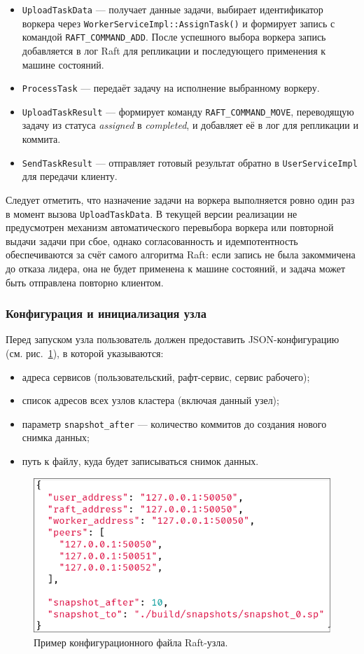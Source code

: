 \begin{itemize}
    \item \texttt{UploadTaskData} — получает данные задачи, выбирает
    идентификатор воркера через \texttt{WorkerServiceImpl::AssignTask()}
    и формирует запись с командой \texttt{RAFT\_COMMAND\_ADD}.
    После успешного выбора воркера запись добавляется в лог Raft
    для репликации и последующего применения к машине состояний.
    \item \texttt{ProcessTask} — передаёт задачу на исполнение выбранному воркеру.
    \item \texttt{UploadTaskResult} — формирует команду
    \texttt{RAFT\_COMMAND\_MOVE}, переводящую задачу из статуса
    \emph{assigned} в \emph{completed}, и добавляет её в лог для
    репликации и коммита.
    \item \texttt{SendTaskResult} — отправляет готовый результат
    обратно в \texttt{UserServiceImpl} для передачи клиенту.
\end{itemize}

Следует отметить, что назначение задачи на воркера выполняется ровно один раз в
момент вызова \texttt{UploadTaskData}. В текущей версии реализации не
предусмотрен механизм автоматического перевыбора воркера или повторной выдачи
задачи при сбое, однако согласованность и идемпотентность обеспечиваются за
счёт самого алгоритма Raft: если запись не была закоммичена до отказа лидера,
она не будет применена к машине состояний, и задача может быть отправлена
повторно клиентом.

\subsubsection{Конфигурация и инициализация узла}

Перед запуском узла пользователь должен предоставить
JSON-конфигурацию (см. рис.~\ref{fig:raftconfig}), в которой указываются:
\begin{itemize}
    \item адреса сервисов (пользовательский, рафт-сервис, сервис рабочего);
    \item список адресов всех узлов кластера (включая данный узел);
    \item параметр \texttt{snapshot\_after} — количество коммитов
    до создания нового снимка данных;
    \item путь к файлу, куда будет записываться снимок данных.
\end{itemize}

\begin{figure}[h!]
    \centering
    \includegraphics[width=0.65\linewidth]{inc/raft_config_example.png}
    \caption{Пример конфигурационного файла Raft-узла.}
    \label{fig:raftconfig}
\end{figure}

